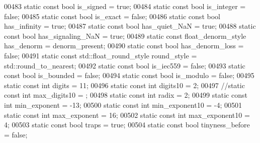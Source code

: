 \begin{DoxyCode}
00483   \textcolor{keyword}{static} \textcolor{keyword}{const} \textcolor{keywordtype}{bool} is\_signed = \textcolor{keyword}{true};
00484   \textcolor{keyword}{static} \textcolor{keyword}{const} \textcolor{keywordtype}{bool} is\_integer = \textcolor{keyword}{false};
00485   \textcolor{keyword}{static} \textcolor{keyword}{const} \textcolor{keywordtype}{bool} is\_exact = \textcolor{keyword}{false};
00486   \textcolor{keyword}{static} \textcolor{keyword}{const} \textcolor{keywordtype}{bool} has\_infinity = \textcolor{keyword}{true};
00487   \textcolor{keyword}{static} \textcolor{keyword}{const} \textcolor{keywordtype}{bool} has\_quiet\_NaN = \textcolor{keyword}{true};
00488   \textcolor{keyword}{static} \textcolor{keyword}{const} \textcolor{keywordtype}{bool} has\_signaling\_NaN = \textcolor{keyword}{true};
00489   \textcolor{keyword}{static} \textcolor{keyword}{const} float\_denorm\_style has\_denorm = denorm\_present;
00490   \textcolor{keyword}{static} \textcolor{keyword}{const} \textcolor{keywordtype}{bool} has\_denorm\_loss = \textcolor{keyword}{false};
00491   \textcolor{keyword}{static} \textcolor{keyword}{const} std::float\_round\_style round\_style = std::round\_to\_nearest;
00492   \textcolor{keyword}{static} \textcolor{keyword}{const} \textcolor{keywordtype}{bool} is\_iec559 = \textcolor{keyword}{false};
00493   \textcolor{keyword}{static} \textcolor{keyword}{const} \textcolor{keywordtype}{bool} is\_bounded = \textcolor{keyword}{false};
00494   \textcolor{keyword}{static} \textcolor{keyword}{const} \textcolor{keywordtype}{bool} is\_modulo = \textcolor{keyword}{false};
00495   \textcolor{keyword}{static} \textcolor{keyword}{const} \textcolor{keywordtype}{int} digits = 11;
00496   \textcolor{keyword}{static} \textcolor{keyword}{const} \textcolor{keywordtype}{int} digits10 = 2;
00497   \textcolor{comment}{//static const int max\_digits10 = ;}
00498   \textcolor{keyword}{static} \textcolor{keyword}{const} \textcolor{keywordtype}{int} radix = 2;
00499   \textcolor{keyword}{static} \textcolor{keyword}{const} \textcolor{keywordtype}{int} min\_exponent = -13;
00500   \textcolor{keyword}{static} \textcolor{keyword}{const} \textcolor{keywordtype}{int} min\_exponent10 = -4;
00501   \textcolor{keyword}{static} \textcolor{keyword}{const} \textcolor{keywordtype}{int} max\_exponent = 16;
00502   \textcolor{keyword}{static} \textcolor{keyword}{const} \textcolor{keywordtype}{int} max\_exponent10 = 4;
00503   \textcolor{keyword}{static} \textcolor{keyword}{const} \textcolor{keywordtype}{bool} traps = \textcolor{keyword}{true};
00504   \textcolor{keyword}{static} \textcolor{keyword}{const} \textcolor{keywordtype}{bool} tinyness\_before = \textcolor{keyword}{false};

\end{DoxyCode}
